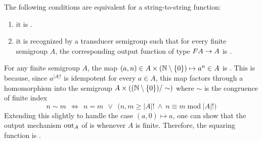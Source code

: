 \begin{theorem}\label{thm:reco-reflecting-functions} The following conditions are equivalent for a string-to-string function:
 \begin{enumerate}
 \item \label{it:reco-refl} it is .
 \item \label{it:trans-semig-reco}it is recognized by a transducer semigroup such that for every finite semigroup $A$, the corresponding output function of type 
 $\functor A \to A$
 is .
 \end{enumerate}
\end{theorem}
\begin{example}\label{ex:squaring-reco-refl}
  For any finite semigroup $A$, the map $(a,n) \in A \times
  ({\mathbb N}\setminus\{0\}) \mapsto a^n \in A$ is . This is
  because, since $a^{|A|!}$ is idempotent for every $a\in A$, this map factors
  through a homomorphism into the semigroup $A \times
  (({\mathbb N}\setminus\{0\})/\sim)$ where $\sim$ is the congruence of
  finite index
  \[ n \sim m ~~\iff~~ n = m ~~\lor~~ \big(n,m \geq |A|! ~\land~ n \equiv m \;\mathrm{mod}\; |A|!\big) \]
  Extending this slightly to handle the case $(a,0)\mapsto a$, one can show that the output mechanism $\mathrm{out}_A$ of  is  whenever $A$ is finite. Therefore, the squaring function is .
\end{example}
